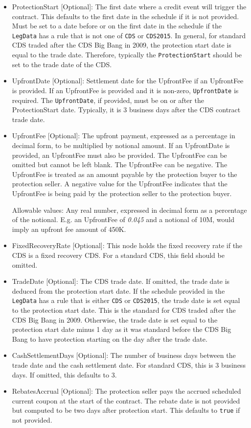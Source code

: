 \begin{itemize}
\item ProtectionStart [Optional]: The first date where a credit event will trigger the contract. This defaults to the first date in the schedule if it is not provided. Must be set to a date before or on the first date in the schedule if the \lstinline!LegData! has a rule that is not one of \lstinline!CDS! or \lstinline!CDS2015!. In general, for standard CDS traded after the CDS Big Bang in 2009, the protection start date is equal to the trade date. Therefore, typically the \lstinline!ProtectionStart! should be set to the trade date of the CDS.
\item UpfrontDate [Optional]: Settlement date for the UpfrontFee if an UpfrontFee is provided. If an UpfrontFee is provided and it is non-zero, \lstinline!UpfrontDate! is required. The \lstinline!UpfrontDate!, if provided, must be on or after the ProtectionStart date. Typically, it is 3 business days after the CDS contract trade date.
\item UpfrontFee [Optional]: The upfront payment, expressed as a percentage in decimal form, to be multiplied by notional amount.  If an UpfrontDate is provided, an UpfrontFee must also be provided. The UpfrontFee can be omitted but cannot be left blank.
The UpfrontFee can be negative. The UpfrontFee is treated as an amount payable by the protection buyer to the protection seller. A negative value for the UpfrontFee indicates that the UpfrontFee is being paid by the protection seller to the protection buyer.

Allowable values: Any real number, expressed in decimal form as a percentage of the notional.  E.g. an UpfrontFee of \emph{0.045} and a notional of 10M, would imply an upfront fee amount of 450K.

\item FixedRecoveryRate [Optional]: This node holds the fixed recovery rate if the CDS is a fixed recovery CDS. For a standard CDS, this field should be omitted.
\item TradeDate [Optional]: The CDS trade date. If omitted, the trade date is deduced from the protection start date. If the schedule provided in the \lstinline!LegData! has a rule that is either \lstinline!CDS! or \lstinline!CDS2015!, the trade date is set equal to the protection start date. This is the standard for CDS traded after the CDS Big Bang in 2009. Otherwise, the trade date is set equal to the protection start date minus 1 day as it was standard before the CDS Big Bang to have protection starting on the day after the trade date.
\item CashSettlementDays [Optional]: The number of business days between the trade date and the cash settlement date. For standard CDS, this is 3 business days. If omitted, this defaults to 3.
\item RebatesAccrual [Optional]: The protection seller pays the accrued scheduled current coupon at the start of the contract. The rebate date is not provided but computed to be two days after protection start. This defaults to \lstinline!true! if not provided.


\end{itemize}
